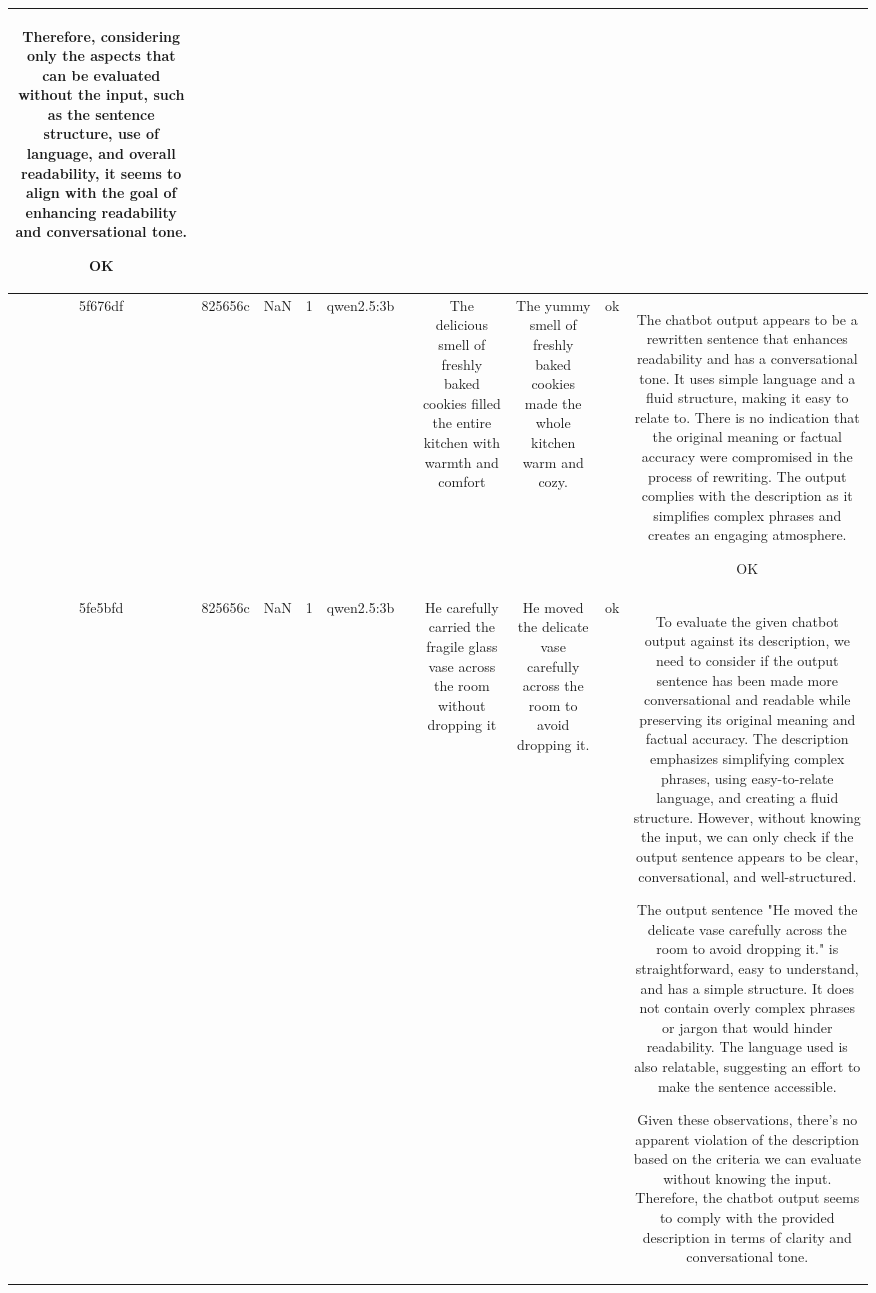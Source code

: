 \begin{table}[h!]
\begin{tabular}{|c|c|c|c|c|c|c|c|c|c|}
Therefore, considering only the aspects that can be evaluated without the input, such as the sentence structure, use of language, and overall readability, it seems to align with the goal of enhancing readability and conversational tone. 

OK\\
\hline
5f676df & 825656c & NaN & 1 & qwen2.5:3b &  & The delicious smell of freshly baked cookies filled the entire kitchen with warmth and comfort & The yummy smell of freshly baked cookies made the whole kitchen warm and cozy. & ok & The chatbot output appears to be a rewritten sentence that enhances readability and has a conversational tone. It uses simple language and a fluid structure, making it easy to relate to. There is no indication that the original meaning or factual accuracy were compromised in the process of rewriting. The output complies with the description as it simplifies complex phrases and creates an engaging atmosphere.

OK\\
\hline
5fe5bfd & 825656c & NaN & 1 & qwen2.5:3b &  & He carefully carried the fragile glass vase across the room without dropping it & He moved the delicate vase carefully across the room to avoid dropping it. & ok & To evaluate the given chatbot output against its description, we need to consider if the output sentence has been made more conversational and readable while preserving its original meaning and factual accuracy. The description emphasizes simplifying complex phrases, using easy-to-relate language, and creating a fluid structure. However, without knowing the input, we can only check if the output sentence appears to be clear, conversational, and well-structured.

The output sentence "He moved the delicate vase carefully across the room to avoid dropping it." is straightforward, easy to understand, and has a simple structure. It does not contain overly complex phrases or jargon that would hinder readability. The language used is also relatable, suggesting an effort to make the sentence accessible.

Given these observations, there's no apparent violation of the description based on the criteria we can evaluate without knowing the input. Therefore, the chatbot output seems to comply with the provided description in terms of clarity and conversational tone.


\end{tabular}
\end{table}
